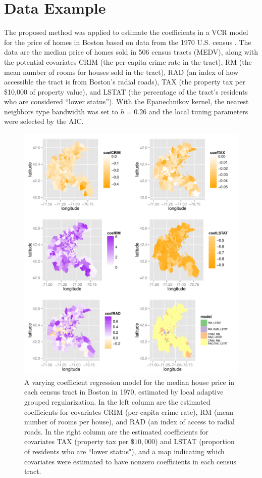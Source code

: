 \documentclass[authoryear,review, 12pt]{elsarticle}
\newcommand{\maxwidth}{\textwidth}
\begin{document}
\section{Data Example\label{sec:example}}

The proposed method was applied to estimate the coefficients
in a VCR model for the price of homes
in Boston based on data from the 1970 U.S. census \citep{Pace-Gilley-1997}.
The data are the median price of homes sold in 506 census tracts (MEDV),
along with the potential covariates CRIM (the per-capita crime rate
in the tract), RM (the mean number of rooms for houses sold in the
tract), RAD (an index of how accessible the tract is from Boston's
radial roads), TAX (the property tax per \$10,000 of property value),
and LSTAT (the percentage of the tract's residents who are considered
``lower status''). With the Epanechnikov kernel, the nearest neighbors type bandwidth
was set to $h=0.26$ and the local tuning parameters were selected by the AIC.

\begin{figure}

\includegraphics[width=\maxwidth]{figure/boston-plots} 
\caption{A varying coefficient regression model for the median house price in each census tract in Boston in 1970, estimated by local adaptive grouped regularization.
In the left column are the estimated coefficients for covariates CRIM (per-capita crime rate), RM (mean number of rooms per house), and RAD (an index of access to radial roads.
In the right column are the estimated coefficients for covariates TAX (property tax per $\$10,000$) and LSTAT (proportion of residents who are ``lower status"), and a map indicating which covariates were estimated to have nonzero coefficients in each census tract.
\label{fig:boston-lagr-coefs}}
\end{figure}
\end{document}

